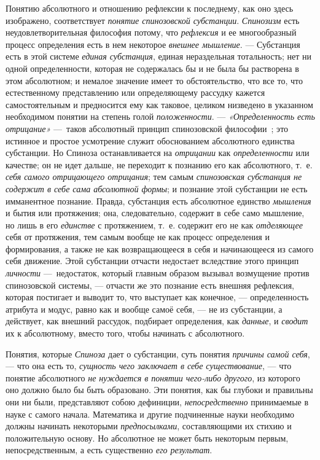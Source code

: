 Понятию абсолютного и отношению рефлексии к последнему, как оно здесь
изображено, соответствует {\em понятие спинозовской
субстанции}. {\em Спинозизм} есть неудовлетворительная
философия потому, что {\em рефлексия} и ее
многообразный процесс определения есть в нем некоторое
{\em внешнее мышление}. — Субстанция есть в этой
системе {\em единая субстанция}, единая нераздельная
тотальность; нет ни одной определенности, которая не содержалась бы и не
была бы растворена в этом абсолютном; и немалое значение имеет то
обстоятельство, что все то, что естественному представлению или
определяющему рассудку кажется самостоятельным и предносится ему как
таковое, целиком низведено в указанном необходимом понятии на степень голой
{\em положенности}. —
{\em «Определенность есть отрицание»} —~таков
абсолютный принцип спинозовской
философии~\label{bkm:Ref474669620};
это истинное и простое усмотрение служит обоснованием абсолютного единства
субстанции. Но Спиноза останавливается на
{\em отрицании} как
{\em определенности} или качестве; он не идет дальше,
не переходит к познанию его как абсолютного, т.~е.
{\em себя самого отрицающего отрицания}; тем самым
{\em спинозовская субстанция не содержит в себе сама
абсолютной формы}; и познание этой субстанции не есть имманентное познание.
Правда, субстанция есть абсолютное единство
{\em мышления} и бытия или протяжения; она,
следовательно, содержит в себе само мышление, но лишь в его
{\em единстве} с протяжением, т.~е. содержит его не как
{\em отделяющее} себя от протяжения, тем самым вообще
не как процесс определения и формирования, а также не как возвращающееся в
себя и начинающееся из самого себя движение. Этой субстанции отчасти
недостает вследствие этого принцип {\em личности}
—~недостаток, который главным образом вызывал возмущение против
спинозовской системы, — отчасти же это познание есть внешняя рефлексия,
которая постигает и выводит то, что выступает как конечное, —
определенность атрибута и модус, равно как и вообще самоё себя, — не из
субстанции, а действует, как внешний рассудок, подбирает определения, как
{\em данные}, и {\em сводит} их к
абсолютному, вместо того, чтобы начинать с абсолютного.

Понятия, которые {\em Спиноза} дает о субстанции, суть
понятия {\em причины самой себя}, — что она есть то,
{\em сущность чего заключает в себе существование}, —
что понятие абсолютного {\em не нуждается в понятии
чего-либо другого}, из которого оно должно было бы быть образовано. Эти
понятия, как бы глубоки и правильны они ни были, представляют собою
дефиниции, {\em непосредственно} принимаемые в науке с
самого начала. Математика и другие подчиненные науки необходимо должны
начинать некоторыми {\em предпосылками}, составляющими
их стихию и положительную основу. Но абсолютное не может быть некоторым
первым, непосредственным, а есть существенно {\em его
результат}.

